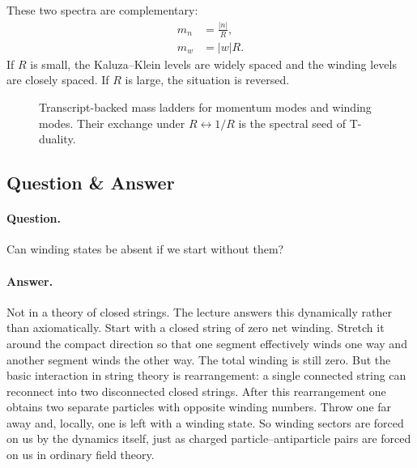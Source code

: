 These two spectra are complementary:
\begin{align}
m_n &= \frac{|n|}{R},\\
m_w &= |w|R.
\end{align}
If \(R\) is small, the Kaluza--Klein levels are widely spaced and the winding levels are closely spaced. If \(R\) is large, the situation is reversed.

\begin{figure}[h]
\centering
{}
\caption{Transcript-backed mass ladders for momentum modes and winding modes. Their exchange under \(R\leftrightarrow 1/R\) is the spectral seed of T-duality.}
\end{figure}

\subsection{Question \& Answer}

\paragraph{Question.} Can winding states be absent if we start without them?

\paragraph{Answer.} Not in a theory of closed strings. The lecture answers this dynamically rather than axiomatically. Start with a closed string of zero net winding. Stretch it around the compact direction so that one segment effectively winds one way and another segment winds the other way. The total winding is still zero. But the basic interaction in string theory is rearrangement: a single connected string can reconnect into two disconnected closed strings. After this rearrangement one obtains two separate particles with opposite winding numbers. Throw one far away and, locally, one is left with a winding state. So winding sectors are forced on us by the dynamics itself, just as charged particle--antiparticle pairs are forced on us in ordinary field theory.

